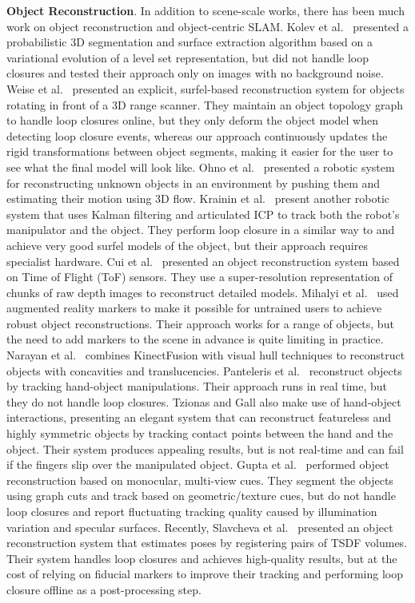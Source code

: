\textbf{Object Reconstruction}. In addition to scene-scale works, there has been much work on object reconstruction and object-centric SLAM. Kolev et al.\ \cite{Kolev2006} presented a probabilistic 3D segmentation and surface extraction algorithm based on a variational evolution of a level set representation, but did not handle loop closures and tested their approach only on images with no background noise. Weise et al.\ \cite{Weise2009} presented an explicit, surfel-based reconstruction system for objects rotating in front of a 3D range scanner. They maintain an object topology graph to handle loop closures online, but they only deform the object model when detecting loop closure events, whereas our approach continuously updates the rigid transformations between object segments, making it easier for the user to see what the final model will look like. Ohno et al.\ \cite{Ohno2011} presented a robotic system for reconstructing unknown objects in an environment by pushing them and estimating their motion using 3D flow. Krainin et al.\ \cite{Krainin2011IJRR} present another robotic system that uses Kalman filtering and articulated ICP to track both the robot's manipulator and the object. They perform loop closure in a similar way to \cite{Weise2009} and achieve very good surfel models of the object, but their approach requires specialist hardware. Cui et al.\ \cite{Cui2013} presented an object reconstruction system based on Time of Flight (ToF) sensors. They use a super-resolution representation of chunks of raw depth images to reconstruct detailed models. Mihalyi et al.\ \cite{Mihalyi2015} used augmented reality markers to make it possible for untrained users to achieve robust object reconstructions. Their approach works for a range of objects, but the need to add markers to the scene in advance is quite limiting in practice. Narayan et al.\ \cite{Narayan2015} combines KinectFusion with visual hull techniques to reconstruct objects with concavities and translucencies. Panteleris et al.\ \cite{Pantaleris2015, Panteleris2015b} reconstruct objects by tracking hand-object manipulations. Their approach runs in real time, but they do not handle loop closures. Tzionas and Gall \cite{Tzionas2015} also make use of hand-object interactions, presenting an elegant system that can reconstruct featureless and highly symmetric objects by tracking contact points between the hand and the object. Their system produces appealing results, but is not real-time and can fail if the fingers slip over the manipulated object. Gupta et al.\ \cite{Gupta2016} performed object reconstruction based on monocular, multi-view cues. They segment the objects using graph cuts and track based on geometric/texture cues, but do not handle loop closures and report fluctuating tracking quality caused by illumination variation and specular surfaces. Recently, Slavcheva et al.\ \cite{slavcheva2016eccv} presented an object reconstruction system that estimates poses by registering pairs of TSDF volumes. Their system handles loop closures and achieves high-quality results, but at the cost of relying on fiducial markers to improve their tracking and performing loop closure offline as a post-processing step.


